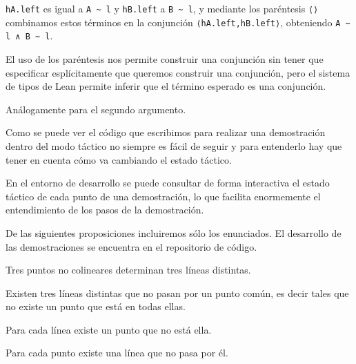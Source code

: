 \begin{enumerate}[label=L.\arabic*, topsep=0mm]
	      \lstinline{hA.left} es igual a \lstinline{A ~ l} y \lstinline{hB.left} a
	      \lstinline{B ~ l}, y mediante los paréntesis \lstinline{⟨⟩} combinamos
	      estos términos en la conjunción \lstinline{⟨hA.left,hB.left⟩}, obteniendo
	      \lstinline{A ~ l ∧ B ~ l}.

	      El uso de los paréntesis nos permite construir una conjunción sin tener
	      que especificar esplícitamente que queremos construir una conjunción, pero
	      el sistema de tipos de Lean permite inferir que el término esperado es una
	      conjunción.

	      Análogamente para el segundo argumento.
\end{enumerate}

Como se puede ver el código que escribimos para realizar una demostración dentro
del modo táctico no siempre es fácil de seguir y para entenderlo hay que tener
en cuenta cómo va cambiando el estado táctico.

En el entorno de desarrollo se puede consultar de forma interactiva el estado
táctico de cada punto de una demostración, lo que facilita enormemente el
entendimiento de los pasos de la demostración.

De las siguientes proposiciones incluiremos sólo los enunciados. El desarrollo
de las demostraciones se encuentra en el repositorio de código.

\begin{prop} Tres puntos no colineares determinan tres líneas distintas.
\end{prop}



\begin{prop}
	Existen tres líneas distintas que no pasan por un punto común, es decir
	tales que no existe un punto que está en todas ellas.
\end{prop}


\begin{prop}
	Para cada línea existe un punto que no está ella.
\end{prop}


\begin{prop}
	Para cada punto existe una línea que no pasa por él.
\end{prop}



